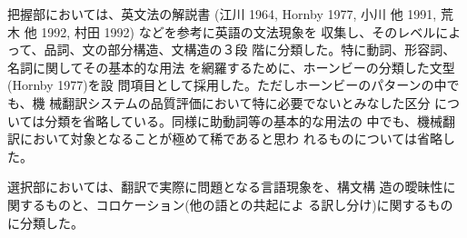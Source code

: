 把握部においては、英文法の解説書
(江川 1964, Hornby 1977, 小川 他 1991, 荒木 他 1992, 村田 1992)
などを参考に英語の文法現象を
収集し、そのレベルによって、品詞、文の部分構造、文構造の３段
階に分類した。特に動詞、形容詞、名詞に関してその基本的な用法
を網羅するために、ホーンビーの分類した文型(Hornby 1977)を設
問項目として採用した。ただしホーンビーのパターンの中でも、機
械翻訳システムの品質評価において特に必要でないとみなした区分
については分類を省略している。同様に助動詞等の基本的な用法の
中でも、機械翻訳において対象となることが極めて稀であると思わ
れるものについては省略した。

選択部においては、翻訳で実際に問題となる言語現象を、構文構
造の曖昧性に関するものと、コロケーション(他の語との共起によ
る訳し分け)に関するものに分類した。

\begin{figure}
\begin{small}
\begin{verbatim}



\end{verbatim}
\end{small}
\end{figure}
